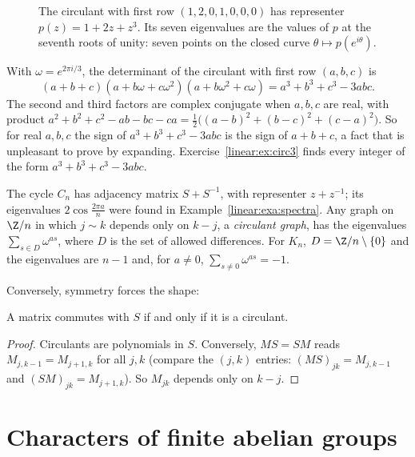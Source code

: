 \begin{figure}[ht]
\centering
{}
\caption{The circulant with first row $(1,2,0,1,0,0,0)$ has representer $p(z)=1+2z+z^3$. Its seven eigenvalues are the values
of $p$ at the seventh roots of unity: seven points on the closed curve $\theta\mapsto p(e^{i\theta})$.}
\label{linear:fig:circulant}
\end{figure}

\begin{example}\label{linear:exa:circ3}
With $\omega=e^{2\pi i/3}$, the determinant of the circulant with first row $(a,b,c)$ is
\[
(a+b+c)(a+b\omega+c\omega^2)(a+b\omega^2+c\omega)=a^3+b^3+c^3-3abc.
\]
The second and third factors are complex conjugate when $a,b,c$ are real, with product $a^2+b^2+c^2-ab-bc-ca=\frac12\bigl((a-b)^2+
(b-c)^2+(c-a)^2\bigr)$. So for real $a,b,c$ the sign of $a^3+b^3+c^3-3abc$ is the sign of $a+b+c$, a fact that is unpleasant to
prove by expanding. Exercise~\ref{linear:ex:circ3} finds every integer of the form $a^3+b^3+c^3-3abc$.
\end{example}

\begin{example}\label{linear:exa:cycle}
The cycle $C_n$ has adjacency matrix $S+S^{-1}$, with representer $z+z^{-1}$; its eigenvalues $2\cos\frac{2\pi a}n$ were
found in Example~\ref{linear:exa:spectra}. Any graph on $\Z/n$ in which $j\sim k$ depends only on $k-j$, a \emph{circulant graph},
has the eigenvalues $\sum_{s\in D}\omega^{as}$, where $D$ is the set of allowed differences. For $K_n$, $D=\Z/n\setminus\{0\}$ and
the eigenvalues are $n-1$ and, for $a\ne0$, $\sum_{s\ne0}\omega^{as}=-1$.
\end{example}

Conversely, symmetry forces the shape:

\begin{proposition}\label{linear:prop:commutant}
A matrix commutes with $S$ if and only if it is a circulant.
\end{proposition}
\begin{proof}
Circulants are polynomials in $S$. Conversely, $MS=SM$ reads $M_{j,k-1}=M_{j+1,k}$ for all $j,k$ (compare the $(j,k)$ entries:
$(MS)_{jk}=M_{j,k-1}$ and $(SM)_{jk}=M_{j+1,k}$). So $M_{jk}$ depends only on $k-j$.
\end{proof}

\section{Characters of finite abelian groups}

